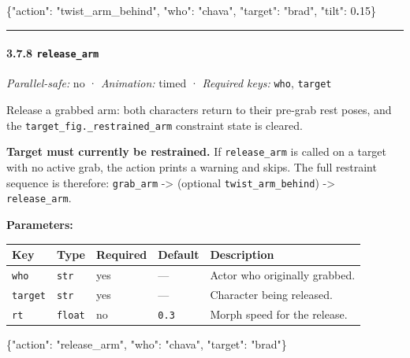 \documentclass[
  11pt,
]{book}
\newenvironment{Shaded}{}{}
\newcommand{\DataTypeTok}[1]{\textcolor[rgb]{0.56,0.13,0.00}{#1}}
\newcommand{\DecValTok}[1]{\textcolor[rgb]{0.25,0.63,0.44}{#1}}
\newcommand{\ErrorTok}[1]{\textcolor[rgb]{1.00,0.00,0.00}{\textbf{#1}}}
\newcommand{\FunctionTok}[1]{\textcolor[rgb]{0.02,0.16,0.49}{#1}}
\newcommand{\StringTok}[1]{\textcolor[rgb]{0.25,0.44,0.63}{#1}}
\begin{document}
\begin{Shaded}
\begin{Highlighting}[]
\FunctionTok{\{}\DataTypeTok{"action"}\FunctionTok{:} \StringTok{"twist\_arm\_behind"}\FunctionTok{,} \DataTypeTok{"who"}\FunctionTok{:} \StringTok{"chava"}\FunctionTok{,} \DataTypeTok{"target"}\FunctionTok{:} \StringTok{"brad"}\FunctionTok{,} \DataTypeTok{"tilt"}\FunctionTok{:} \DecValTok{0}\ErrorTok{.}\DecValTok{15}\FunctionTok{\}}
\end{Highlighting}
\end{Shaded}

\begin{center}\rule{0.5\linewidth}{0.5pt}\end{center}

\paragraph{\texorpdfstring{3.7.8
\texttt{release\_arm}}{3.7.8 release\_arm}}\label{release_arm}

\emph{Parallel-safe:} no · \emph{Animation:} timed · \emph{Required
keys:} \texttt{who}, \texttt{target}

Release a grabbed arm: both characters return to their pre-grab rest
poses, and the \texttt{target\_fig.\_restrained\_arm} constraint state
is cleared.

\textbf{Target must currently be restrained.} If \texttt{release\_arm}
is called on a target with no active grab, the action prints a warning
and skips. The full restraint sequence is therefore: \texttt{grab\_arm}
-\textgreater{} (optional \texttt{twist\_arm\_behind}) -\textgreater{}
\texttt{release\_arm}.

\textbf{Parameters:}

\begin{longtable}[]{@{}lllll@{}}
\toprule\noalign{}
Key & Type & Required & Default & Description \\
\midrule\noalign{}
\endhead
\bottomrule\noalign{}
\endlastfoot
\texttt{who} & \texttt{str} & yes & --- & Actor who originally
grabbed. \\
\texttt{target} & \texttt{str} & yes & --- & Character being
released. \\
\texttt{rt} & \texttt{float} & no & \texttt{0.3} & Morph speed for the
release. \\
\end{longtable}

\begin{Shaded}
\begin{Highlighting}[]
\FunctionTok{\{}\DataTypeTok{"action"}\FunctionTok{:} \StringTok{"release\_arm"}\FunctionTok{,} \DataTypeTok{"who"}\FunctionTok{:} \StringTok{"chava"}\FunctionTok{,} \DataTypeTok{"target"}\FunctionTok{:} \StringTok{"brad"}\FunctionTok{\}}
\end{Highlighting}
\end{Shaded}
\end{document}
